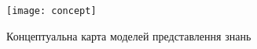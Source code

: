 \begin{landscape}

\begin{figure}[H]
    \centering
        \texttt{[image: concept]}
    \caption{Концептуальна карта моделей представлення знань}
    \label{fig:concept}
\end{figure}

\end{landscape}
